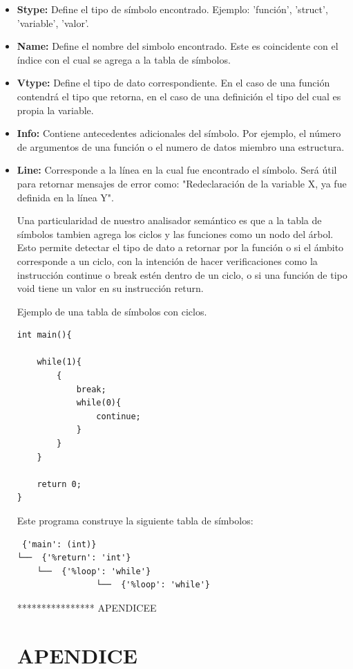 \documentclass[12pt]{article}
\begin{document}
\begin{itemize}
    \item  \textbf{Stype:} Define el tipo de s\'imbolo encontrado. Ejemplo: 'funci\'on', 'struct', 'variable', 'valor'.
    \item  \textbf{Name:} Define el nombre del simbolo encontrado. Este es coincidente con el \'indice con el cual se agrega a la tabla de s\'imbolos.
    \item  \textbf{Vtype:} Define el tipo de dato correspondiente. En el caso de una funci\'on contendr\'a el tipo que retorna, en el caso de una definici\'on el tipo del cual es propia la variable. 
    \item  \textbf{Info:} Contiene antecedentes adicionales del s\'imbolo. Por ejemplo, el n\'umero de argumentos de una funci\'on o el numero de datos miembro una estructura. 
    \item  \textbf{Line:} Corresponde a la l\'inea en la cual fue encontrado el s\'imbolo. Ser\'a \'util para retornar mensajes de error como: "Redeclaraci\'on de la variable X, ya fue definida en la l\'inea Y". 

Una particularidad de nuestro analisador sem\'antico es que a la tabla de s\'imbolos tambien agrega los ciclos y las funciones como un nodo del \'arbol. Esto permite detectar el tipo de dato a retornar por la funci\'on o si el \'ambito corresponde a un ciclo, con la intenci\'on de hacer verificaciones como la instrucci\'on continue o break est\'en dentro de un ciclo, o si una funci\'on de tipo void tiene un valor en su instrucci\'on return.

Ejemplo de una tabla de s\'imbolos con ciclos.

\begin{verbatim}
int main(){

    while(1){
        {
            break;
            while(0){
                continue;
            }
        }
    }

    return 0;
}
\end{verbatim}

Este programa construye la siguiente tabla de s\'imbolos:
\begin{verbatim}
 {'main': (int)}
└──  {'%return': 'int'}
    └──  {'%loop': 'while'}
                └──  {'%loop': 'while'}
\end{verbatim}





**************** APENDICEE
\section*{APENDICE}


\end{itemize}
\end{document}
